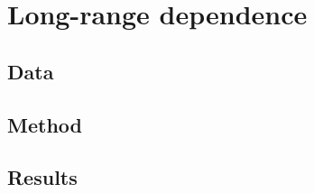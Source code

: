 \documentclass[main.tex]{subfiles}
\begin{document}
\part{Long-range dependence}

\chapter{Data}

\chapter{Method}

\chapter{Results}
\end{document}
